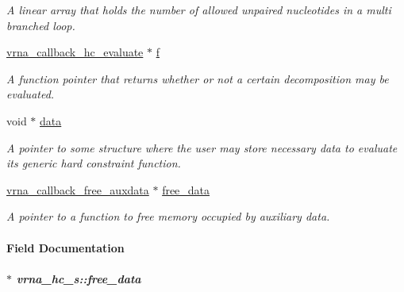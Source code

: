 \begin{DoxyCompactItemize}
\begin{DoxyCompactList}\small\item\em A linear array that holds the number of allowed unpaired nucleotides in a multi branched loop. \end{DoxyCompactList}\item 
\hyperlink{group__hard__constraints_ga16eb71ac9a7a35369be2eaa9d8f8dfa0}{vrna\+\_\+callback\+\_\+hc\+\_\+evaluate} $\ast$ \hyperlink{group__hard__constraints_a85714afbf27012165ec80c564bd62931}{f}\hypertarget{group__hard__constraints_a85714afbf27012165ec80c564bd62931}{}\label{group__hard__constraints_a85714afbf27012165ec80c564bd62931}

\begin{DoxyCompactList}\small\item\em A function pointer that returns whether or not a certain decomposition may be evaluated. \end{DoxyCompactList}\item 
void $\ast$ \hyperlink{group__hard__constraints_acef3d722142cb5f4a8e114e5fbce3b1a}{data}\hypertarget{group__hard__constraints_acef3d722142cb5f4a8e114e5fbce3b1a}{}\label{group__hard__constraints_acef3d722142cb5f4a8e114e5fbce3b1a}

\begin{DoxyCompactList}\small\item\em A pointer to some structure where the user may store necessary data to evaluate its generic hard constraint function. \end{DoxyCompactList}\item 
\hyperlink{group__fold__compound_ga3ae51bfd5fc3236652d1de4e3274b49b}{vrna\+\_\+callback\+\_\+free\+\_\+auxdata} $\ast$ \hyperlink{group__hard__constraints_a970e0e202c9e46ebc7640ddc43357ba6}{free\+\_\+data}
\begin{DoxyCompactList}\small\item\em A pointer to a function to free memory occupied by auxiliary data. \end{DoxyCompactList}\end{DoxyCompactItemize}


\paragraph{Field Documentation}
\subparagraph[{\texorpdfstring{free\+\_\+data}{free_data}}]{$\ast$ vrna\+\_\+hc\+\_\+s\+::free\+\_\+data}\hypertarget{group__hard__constraints_a970e0e202c9e46ebc7640ddc43357ba6}{}\label{group__hard__constraints_a970e0e202c9e46ebc7640ddc43357ba6}


